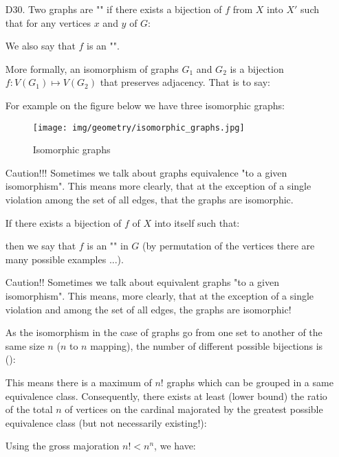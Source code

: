 {\begin{enumerate}
		\item[D30.] Two graphs are "" if there exists a bijection of $f$ from $X$ into $X'$ such that for any vertices $x$ and $y$ of $G$:
		
		We also say that $f$ is an "".
		
		More formally, an isomorphism of graphs $G_1$ and $G_2$ is a bijection $f:V(G_1)\mapsto V(G_2)$ that preserves adjacency. That is to say:
	
	
		For example on the figure below we have three isomorphic graphs:
		\begin{figure}[H]
			\centering
			\texttt{[image: img/geometry/isomorphic\_graphs.jpg]}
			\caption{Isomorphic graphs}
		\end{figure}
		\begin{tcolorbox}[colback=red!5,borderline={1mm}{2mm}{red!5},arc=0mm,boxrule=0pt]
	Caution!!! Sometimes we talk about graphs equivalence "to a given isomorphism". This means more clearly, that at the exception of a single violation among the set of all edges, that the graphs are isomorphic.
		\end{tcolorbox}
		
		If there exists a bijection of $f$ of $X$ into itself such that:
		
		then we say that $f$ is an "" in $G$ (by permutation of the vertices there are many possible examples ...).
		
		\begin{tcolorbox}[title=Remark,colframe=black,arc=10pt]
		Caution!! Sometimes we talk about equivalent graphs "to a given isomorphism". This means, more clearly, that at the exception of a single violation and among the set of all edges, the graphs are isomorphic!
		\end{tcolorbox}
		As the isomorphism in the case of graphs go from one set to another of the same size $n$ ($n$ to $n$ mapping), the number of different possible bijections is ():
		
		This means there is a maximum of $n!$ graphs which can be grouped in a same equivalence class. Consequently, there exists at least (lower bound) the ratio of the total $n$ of vertices on the cardinal majorated by the greatest possible equivalence class (but not necessarily existing!):
			
		Using the gross majoration $n!<n^n$, we have:
		

\end{enumerate}}
